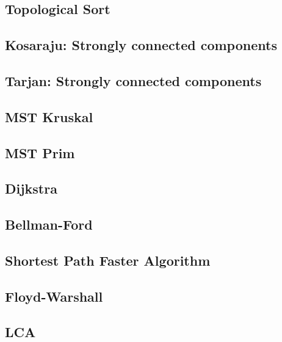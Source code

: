 \subsection{Topological Sort}
\raggedbottom
\hrulefill
\subsection{Kosaraju: Strongly connected components}
\raggedbottom
\hrulefill
\subsection{Tarjan: Strongly connected components}
\raggedbottom
\hrulefill
\subsection{MST Kruskal}
\raggedbottom
\hrulefill
\subsection{MST Prim}
\raggedbottom
\hrulefill
\subsection{Dijkstra}
\raggedbottom
\hrulefill
\subsection{Bellman-Ford}
\raggedbottom
\hrulefill
\subsection{Shortest Path Faster Algorithm}
\raggedbottom
\hrulefill
\subsection{Floyd-Warshall}
\raggedbottom
\hrulefill
\subsection{LCA}
\raggedbottom
\hrulefill
